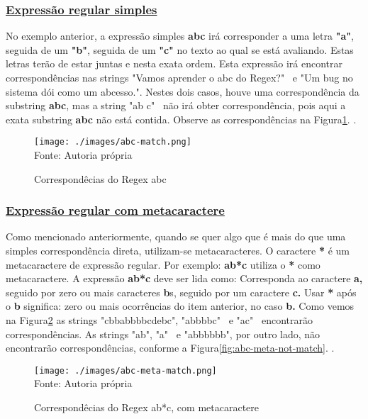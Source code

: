 \subsubsection{\underline{Expressão regular simples}}

No exemplo anterior, a expressão simples
\textbf{abc}
irá corresponder a uma letra
\textbf{"a"},
seguida de um
\textbf{"b"},
seguida de um
\textbf{"c"}
no texto ao qual se está avaliando.
Estas letras terão de estar juntas e nesta exata ordem.
Esta expressão irá encontrar correspondências nas strings
"Vamos aprender o abc do Regex?"~
e
"Um bug no sistema dói como um abcesso.".
Nestes dois casos, houve uma correspondência da substring
\textbf{abc},
mas a string
"ab c"~
não irá obter correspondência, pois aqui a exata substring
\textbf{abc}
não está contida. Observe as correspondências na
Figura\ref{fig:abc-match}.
\cite{mdn-regex}.

\begin{figure}[H]
    \centering
    \caption{Correspondêcias do Regex abc}
    \texttt{[image: ./images/abc-match.png]}
    \label{fig:abc-match} \\
    \textnormal{\fontsize{10pt}{12pt}Fonte: Autoria própria}
\end{figure}

\subsubsection{\underline{Expressão regular com metacaractere}}

Como mencionado anteriormente, quando se quer algo que é mais do
que uma simples correspondência direta, utilizam-se metacaracteres.
O caractere
\textbf{*}
é um metacaractere de expressão regular. Por exemplo:
\textbf{ab*c}
utiliza o
\textbf{*}
como metacaractere. A expressão
\textbf{ab*c}
deve ser lida como: Corresponda ao caractere
\textbf{a,}
seguido por zero ou mais caracteres
\textbf{b}s,
seguido por um caractere
\textbf{c.}
Usar
\textbf{*}
após o
\textbf{b}
significa: zero ou mais ocorrências do item anterior, no caso
\textbf{b.}
Como vemos na
Figura\ref{fig:abc-meta-match}
as strings "cbbabbbbcdebc", "abbbbc"~ e "ac"~
encontrarão correspondências. As strings "ab", "a"~ e "abbbbbb", por
outro lado, não encontrarão correspondências, conforme a
Figura\ref{fig:abc-meta-not-match}.
\cite{mdn-regex}.

\begin{figure}[H]
    \centering
    \caption{Correspondêcias do Regex ab*c, com metacaractere}
    \texttt{[image: ./images/abc-meta-match.png]}
    \label{fig:abc-meta-match} \\
    \textnormal{\fontsize{10pt}{12pt}Fonte: Autoria própria}
\end{figure}


